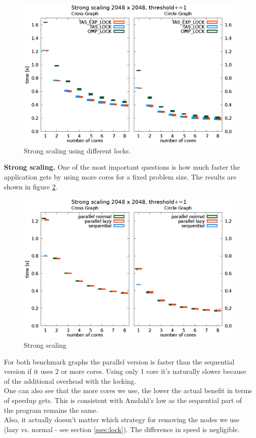 \documentclass[letterpaper]{article}
\newcommand{\mypar}[1]{{\bf #1.}}
\begin{document}
\begin{figure}[h]\centering
  \includegraphics[scale=0.558]{lock_benchmark.eps}
  \caption{Strong scaling using different locks.\label{fig:lock_bench}}
\end{figure}


\mypar{Strong scaling}
One of the most important questions is how much faster the application gets by using more cores for a fixed problem size. The results are shown in figure \ref{fig:strong_scaling}.
\begin{figure}[h]\centering
  \includegraphics[scale=0.558]{strong_scaling.eps}
  \caption{Strong scaling \label{fig:strong_scaling}}
\end{figure}
For both benchmark graphs the parallel version is faster than the sequential version if it uses 2 or more cores. Using only 1 core it's naturally slower because of the additional overhead with the locking.\\
One can also see that the more cores we use, the lower the actual benefit in terms of speedup gets. This is consistent with Amdahl's law as the sequential part of the program remains the same.\\
Also, it actually doesn't matter which strategy for removing the nodes we use (lazy vs. normal - see section \ref{ssec:lock}). The difference in speed is negligible.
\end{document}
